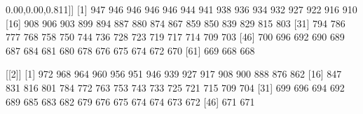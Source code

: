 \documentclass[]{article}
\newenvironment{Shaded}{\begin{snugshade}}{\end{snugshade}}
\newcommand{\DecValTok}[1]{\textcolor[rgb]{0.00,0.00,0.81}{#1}}
\newcommand{\NormalTok}[1]{#1}
\begin{document}
\begin{Shaded}
\begin{Highlighting}[]
\NormalTok{[[}\DecValTok{1}\NormalTok{]]}
\NormalTok{ [}\DecValTok{1}\NormalTok{] }\DecValTok{947} \DecValTok{946} \DecValTok{946} \DecValTok{946} \DecValTok{946} \DecValTok{944} \DecValTok{941} \DecValTok{938} \DecValTok{936} \DecValTok{934} \DecValTok{932} \DecValTok{927} \DecValTok{922} \DecValTok{916} \DecValTok{910}
\NormalTok{[}\DecValTok{16}\NormalTok{] }\DecValTok{908} \DecValTok{906} \DecValTok{903} \DecValTok{899} \DecValTok{894} \DecValTok{887} \DecValTok{880} \DecValTok{874} \DecValTok{867} \DecValTok{859} \DecValTok{850} \DecValTok{839} \DecValTok{829} \DecValTok{815} \DecValTok{803}
\NormalTok{[}\DecValTok{31}\NormalTok{] }\DecValTok{794} \DecValTok{786} \DecValTok{777} \DecValTok{768} \DecValTok{758} \DecValTok{750} \DecValTok{744} \DecValTok{736} \DecValTok{728} \DecValTok{723} \DecValTok{719} \DecValTok{717} \DecValTok{714} \DecValTok{709} \DecValTok{703}
\NormalTok{[}\DecValTok{46}\NormalTok{] }\DecValTok{700} \DecValTok{696} \DecValTok{692} \DecValTok{690} \DecValTok{689} \DecValTok{687} \DecValTok{684} \DecValTok{681} \DecValTok{680} \DecValTok{678} \DecValTok{676} \DecValTok{675} \DecValTok{674} \DecValTok{672} \DecValTok{670}
\NormalTok{[}\DecValTok{61}\NormalTok{] }\DecValTok{669} \DecValTok{668} \DecValTok{668}

\NormalTok{[[}\DecValTok{2}\NormalTok{]]}
\NormalTok{ [}\DecValTok{1}\NormalTok{] }\DecValTok{972} \DecValTok{968} \DecValTok{964} \DecValTok{960} \DecValTok{956} \DecValTok{951} \DecValTok{946} \DecValTok{939} \DecValTok{927} \DecValTok{917} \DecValTok{908} \DecValTok{900} \DecValTok{888} \DecValTok{876} \DecValTok{862}
\NormalTok{[}\DecValTok{16}\NormalTok{] }\DecValTok{847} \DecValTok{831} \DecValTok{816} \DecValTok{801} \DecValTok{784} \DecValTok{772} \DecValTok{763} \DecValTok{753} \DecValTok{743} \DecValTok{733} \DecValTok{725} \DecValTok{721} \DecValTok{715} \DecValTok{709} \DecValTok{704}
\NormalTok{[}\DecValTok{31}\NormalTok{] }\DecValTok{699} \DecValTok{696} \DecValTok{694} \DecValTok{692} \DecValTok{689} \DecValTok{685} \DecValTok{683} \DecValTok{682} \DecValTok{679} \DecValTok{676} \DecValTok{675} \DecValTok{674} \DecValTok{674} \DecValTok{673} \DecValTok{672}
\NormalTok{[}\DecValTok{46}\NormalTok{] }\DecValTok{671} \DecValTok{671}


\end{Highlighting}
\end{Shaded}
\end{document}
